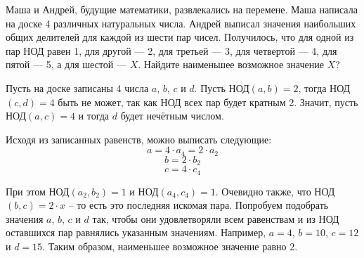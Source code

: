 
Маша и Андрей, будущие математики, развлекались на перемене. Маша написала на доске 4 различных натуральных числа. Андрей выписал значения наибольших общих делителей для каждой из шести пар чисел. Получилось, что для одной из пар НОД  равен 1, для другой — 2, для третьей — 3, для четвертой — 4, для пятой — 5, а для шестой — $X$. Найдите наименьшее возможное значение $X$?

\solutionSection

Пусть на доске записаны 4 числа $a$, $b$, $c$ и $d$. Пусть НОД$(a, b) = 2$, тогда \linebreak НОД$(c, d) = 4$ быть не может, так как НОД всех пар будет кратным 2. Значит, пусть НОД$(a, c) = 4$ и тогда $d$ будет нечётным числом.

Исходя из записанных равенств, можно выписать следующие:
$$a = 4\cdot a_4 = 2 \cdot a_2$$
$$b = 2\cdot b_2$$
$$c = 4\cdot c_4$$

При этом НОД$(a_2, b_2) = 1$ и НОД$(a_4, c_4) = 1$. Очевидно также, что \linebreak НОД$(b, c) = 2 \cdot x$ -- то есть это последняя искомая пара. Попробуем подобрать значения $a$, $b$, $c$ и $d$ так, чтобы они удовлетворяли всем равенствам и из НОД оставшихся пар равнялись указанным значениям. Например, $a = 4$, $b = 10$, $c = 12$ и $d = 15$. Таким образом, наименьшее возможное значение равно 2.

